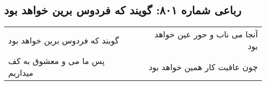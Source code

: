 \begin{center}
\section*{رباعی شماره ۸۰۱: گویند که فردوس برین خواهد بود}
\label{sec:0801}
\begin{longtable}{l p{0.5cm} r}
گویند که فردوس برین خواهد بود
&&
آنجا می ناب و حور عین خواهد بود
\\
پس ما می و معشوق به کف میداریم
&&
چون عاقبت کار همین خواهد بود
\\
\end{longtable}
\end{center}
